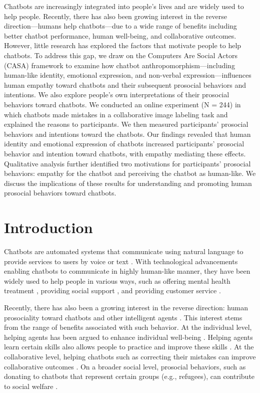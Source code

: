 Chatbots are increasingly integrated into people’s lives and are widely used to help people. Recently, there has also been growing interest in the reverse direction—humans help chatbots—due to a wide range of benefits including better chatbot performance, human well-being, and collaborative outcomes. However, little research has explored the factors that motivate people to help chatbots. To address this gap, we draw on the Computers Are Social Actors (CASA) framework to examine how chatbot anthropomorphism—including human-like identity, emotional expression, and non-verbal expression—influences human empathy toward chatbots and their subsequent prosocial behaviors and intentions. We also explore people's own interpretations of their prosocial behaviors toward chatbots. We conducted an online experiment (N = 244) in which chatbots made mistakes in a collaborative image labeling task and explained the reasons to participants. We then measured participants’ prosocial behaviors and intentions toward the chatbots. Our findings revealed that human identity and emotional expression of chatbots increased participants’ prosocial behavior and intention toward chatbots, with empathy mediating these effects. Qualitative analysis further identified two motivations for participants' prosocial behaviors: empathy for the chatbot and perceiving the chatbot as human-like. We discuss the implications of these results for understanding and promoting human prosocial behaviors toward chatbots.

\section{Introduction}
Chatbots are automated systems that communicate using natural language to provide services to users by voice or text \cite{brandtzaeg2018chatbots, pan2024human, song2025more}. With technological advancements enabling chatbots to communicate in highly human-like manner, they have been widely used to help people in various ways, such as offering mental health treatment \cite{lee2020hear, lee2020designing, Lee2019caring}, providing social support \cite{song2025greater, macgeorge2011supportive, meng2023mediated, jiang2020response}, and providing customer service \cite{janson2023leverage}. 


Recently, there has also been a growing interest in the reverse direction: human prosociality toward chatbots and other intelligent agents \cite{OLIVEIRA2021106547, NIELSEN2022260}. This interest stems from the range of benefits associated with such behavior. At the individual level, helping agents has been argued to enhance individual well-being \cite{OLIVEIRA2021106547, zhu2025benefits}. Helping agents learn certain skills also allows people to practice and improve these skills \cite{aknin2013prosocial, howell2011momentary, Lee2019caring}. At the collaborative level, helping chatbots such as correcting their mistakes can improve collaborative outcomes \cite{OLIVEIRA2021106547, NIELSEN2022260}. On a broader social level, prosocial behaviors, such as donating to chatbots that represent certain groups (e.g., refugees), can contribute to social welfare \cite{namkoong2023effect, OLIVEIRA2021106547}.


